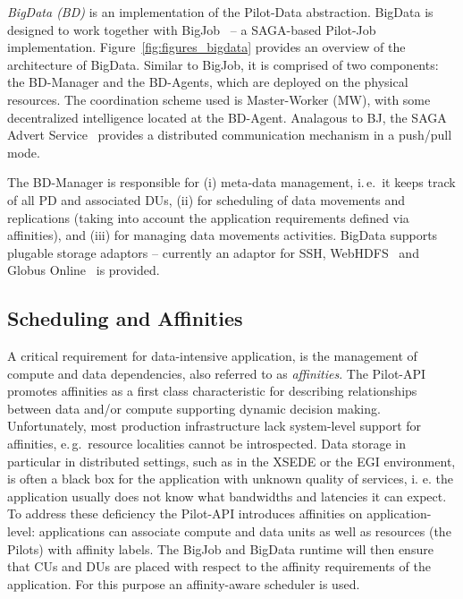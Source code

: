 \documentclass{acm_proc_article-sp}
\newcommand{\jhanote}[1]{ {\textcolor{red} { ***SJ: #1 }}}
\newcommand{\alnote}[1]{ {\textcolor{blue} { ***andreL: #1 }}}
\newcommand{\alnote}[1]{}
\newcommand{\jhanote}[1]{}
\newcommand{\upp}{\vspace*{-0.5em}}
\newcommand{\pilots}{Pilots\xspace}
\newcommand{\dus}{DUs\xspace}
\newcommand{\pd}{PD\xspace}
\begin{document}
{\it BigData (BD)} is an implementation of the Pilot-Data
abstraction. BigData is designed to work together with
BigJob~\cite{bigjob_web} -- a SAGA-based Pilot-Job implementation.
Figure~\ref{fig:figures_bigdata} provides an overview of the
architecture of BigData. Similar to BigJob, it is comprised of two
components: the BD-Manager and the BD-Agents, which are deployed on
the physical resources.  The coordination scheme used is Master-Worker
(MW), with some decentralized intelligence located at the BD-Agent.
Analagous to BJ, the SAGA Advert Service~\cite{saga_advert} 
provides a distributed communication mechanism in a push/pull mode.

The BD-Manager is responsible for (i) meta-data management, i.\,e.\ it
keeps track of all \pd and associated \dus, 
(ii) for scheduling of data movements and replications 
(taking into account the application requirements defined
via affinities), and (iii) for managing data movements activities. 
BigData supports plugable storage adaptors -- currently an adaptor 
for SSH, WebHDFS~\cite{webhdfs} and Globus Online~\cite{10.1109/MIC.2011.64}
is provided. 


\upp
\subsection{Scheduling and Affinities}
\label{sec-affinities}

A critical requirement for data-intensive application, is the management
of compute and data dependencies, also referred to as {\it affinities}. 
The Pilot-API promotes affinities as a first class
characteristic for describing relationships between data and/or
compute supporting dynamic decision making. Unfortunately, most
production infrastructure lack system-level support for affinities,
e.\,g.\ resource localities cannot be introspected. Data storage in
particular in distributed settings, such as in the XSEDE or the EGI
environment, is often a black box for the application with unknown
quality of services, i. e. the application usually does not know what
bandwidths and latencies it can expect. To address these deficiency
the Pilot-API introduces affinities on application-level: applications
can associate compute and data units as well as resources (the
\pilots) with affinity labels. The BigJob and BigData runtime will
then ensure that CUs and DUs are placed with respect to the affinity
requirements of the application. For this purpose an affinity-aware 
scheduler is used.
\end{document}
